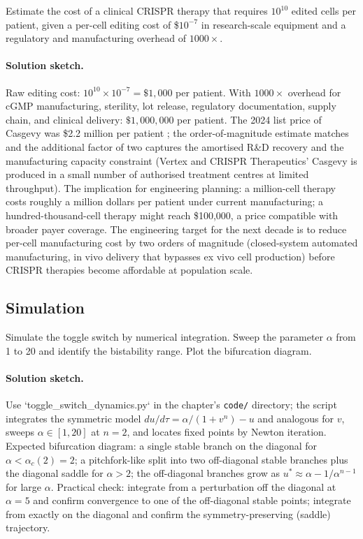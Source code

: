 \begin{exercise}
Estimate the cost of a clinical CRISPR therapy that requires
$10^{10}$ edited cells per patient, given a per-cell editing cost of
\$$10^{-7}$ in research-scale equipment and a regulatory and
manufacturing overhead of $1000\times$.

\paragraph{Solution sketch.}
Raw editing cost: $10^{10} \times 10^{-7} = \$1{,}000$ per patient.
With $1000\times$ overhead for cGMP manufacturing, sterility, lot
release, regulatory documentation, supply chain, and clinical
delivery: $\$1{,}000{,}000$ per patient. The 2024 list price of
Casgevy was \$2.2 million per patient
\cite{web:v6c09-fda-casgevy-2023}; the order-of-magnitude estimate
matches and the additional factor of two captures the
amortised R\&D recovery and the manufacturing capacity
constraint (Vertex and CRISPR Therapeutics' Casgevy is produced
in a small number of authorised treatment centres at limited
throughput). The implication for engineering planning: a
million-cell therapy costs roughly a million dollars per patient
under current manufacturing; a hundred-thousand-cell therapy might
reach \$100{,}000, a price compatible with broader payer coverage.
The engineering target for the next decade is to reduce per-cell
manufacturing cost by two orders of magnitude (closed-system
automated manufacturing, in vivo delivery that bypasses ex vivo
cell production) before CRISPR therapies become affordable at
population scale.
\end{exercise}

\subsection*{Simulation}

\begin{exercise}
Simulate the toggle switch by numerical integration. Sweep the
parameter $\alpha$ from 1 to 20 and identify the bistability range.
Plot the bifurcation diagram.

\paragraph{Solution sketch.}
Use `toggle\_switch\_dynamics.py` in the chapter's \texttt{code/}
directory; the script integrates the symmetric model
$du/d\tau = \alpha/(1+v^{n}) - u$ and analogous for $v$, sweeps
$\alpha \in [1, 20]$ at $n = 2$, and locates fixed points by
Newton iteration. Expected bifurcation diagram: a single stable
branch on the diagonal for $\alpha < \alpha_{c}(2) = 2$; a
pitchfork-like split into two off-diagonal stable branches plus the
diagonal saddle for $\alpha > 2$; the off-diagonal branches grow
as $u^{*} \approx \alpha - 1/\alpha^{n-1}$ for large $\alpha$.
Practical check: integrate from a perturbation off the diagonal at
$\alpha = 5$ and confirm convergence to one of the off-diagonal
stable points; integrate from exactly on the diagonal and confirm
the symmetry-preserving (saddle) trajectory.
\end{exercise}

